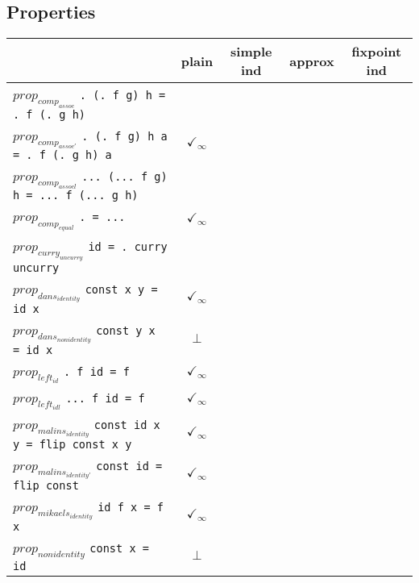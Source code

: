 \documentclass{article}
\begin{document}
\subsection*{Properties}
\begin{longtable}{p{10cm} || c | c | c | c | }
  & plain & simple ind & approx & fixpoint ind \\
\hline
$prop_{comp_{assoc}}$ \newline \verb`. (. f g) h = . f (. g h)` &  &  &  &  \\
\hline
$prop_{comp_{assoc'}}$ \newline \verb`. (. f g) h a = . f (. g h) a` & $\checkmark_{\infty}$ &  &  &  \\
\hline
$prop_{comp_{assocl}}$ \newline \verb`... (... f g) h = ... f (... g h)` &  &  &  &  \\
\hline
$prop_{comp_{equal}}$ \newline \verb`. = ...` & $\checkmark_{\infty}$ &  &  &  \\
\hline
$prop_{curry_{uncurry}}$ \newline \verb`id = . curry uncurry` &  &  &  &  \\
\hline
$prop_{dans_{identity}}$ \newline \verb`const x y = id x` & $\checkmark_{\infty}$ &  &  &  \\
\hline
$prop_{dans_{nonidentity}}$ \newline \verb`const y x = id x` & $\bot$ &  &  &  \\
\hline
$prop_{left_{id}}$ \newline \verb`. f id = f` & $\checkmark_{\infty}$ &  &  &  \\
\hline
$prop_{left_{idl}}$ \newline \verb`... f id = f` & $\checkmark_{\infty}$ &  &  &  \\
\hline
$prop_{malins_{identity}}$ \newline \verb`const id x y = flip const x y` & $\checkmark_{\infty}$ &  &  &  \\
\hline
$prop_{malins_{identity'}}$ \newline \verb`const id = flip const` & $\checkmark_{\infty}$ &  &  &  \\
\hline
$prop_{mikaels_{identity}}$ \newline \verb`id f x = f x` & $\checkmark_{\infty}$ &  &  &  \\
\hline
$prop_{nonidentity}$ \newline \verb`const x = id` & $\bot$ &  &  &  \\

\end{longtable}
\end{document}
